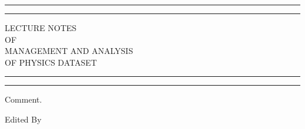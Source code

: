 \begin{titlepage} %

	\centering %
	
	\scshape %
	
	\vspace*{\baselineskip} %
	
	
	\rule{\textwidth}{1.6pt}\vspace*{-\baselineskip}\vspace*{2pt} %
	\rule{\textwidth}{0.4pt} %
	
	\vspace{0.75\baselineskip} %
	
	{\LARGE LECTURE NOTES\\ OF\\ MANAGEMENT AND ANALYSIS\\ OF PHYSICS DATASET \\} %
	
	\vspace{0.75\baselineskip} %
	
	\rule{\textwidth}{0.4pt}\vspace*{-\baselineskip}\vspace{3.2pt} %
	\rule{\textwidth}{1.6pt} %
	
	\vspace{2\baselineskip} %
	
	
    Comment. %
	
	\vspace*{3\baselineskip} %
	
	
	Edited By
	
	\vspace{0.5\baselineskip} %
	

\end{titlepage}

